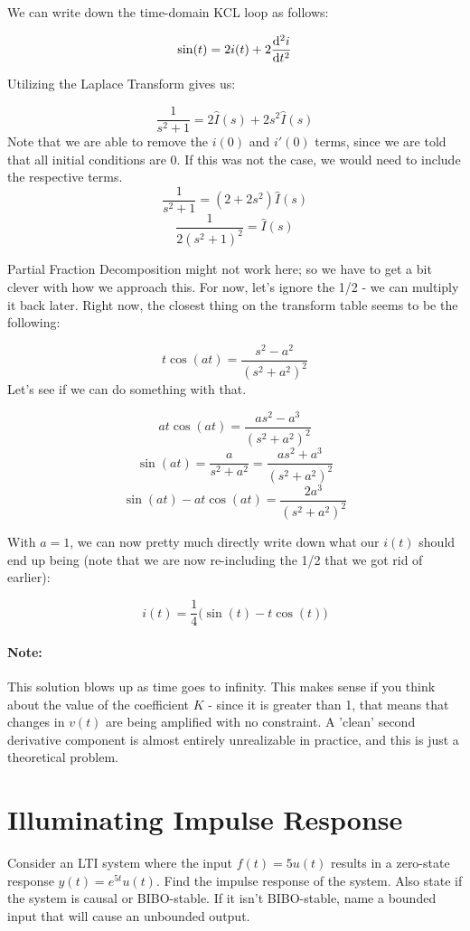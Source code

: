 \documentclass{article}
\begin{document}
We can write down the time-domain KCL loop as follows:

\[
\sin(t) = 2i(t) + 2\dv[2]{i}{t}
\]

Utilizing the Laplace Transform gives us:

\[
\frac{1}{s^2+1} = 2\hat{I}(s) + 2s^2\hat{I}(s)
\]
Note that we are able to remove the $i(0)$ and $i'(0)$ terms, since we are told that all initial conditions are 0. If this was not the case, we would need to include the respective terms.
\[
\frac{1}{s^2+1} = (2+2s^2)\hat{I}(s)
\]
\[
\frac{1}{2(s^2+1)^2} = \hat{I}(s)
\]

Partial Fraction Decomposition might not work here; so we have to get a bit clever with how we approach this. For now, let's ignore the 1/2 - we can multiply it back later. Right now, the closest thing on the transform table seems to be the following:

\[
t\cos(at) = \frac{s^2 - a^2}{(s^2 + a^2)^2}
\]
Let's see if we can do something with that.

\[
at\cos(at) = \frac{as^2 - a^3}{(s^2 + a^2)^2}
\]
\[
\sin(at) = \frac{a}{s^2+a^2} = \frac{as^2 + a^3}{(s^2 + a^2)^2}
\]
\[
\sin(at) - at\cos(at) = \frac{2a^3}{(s^2 + a^2)^2}
\]

With $a = 1$, we can now pretty much directly write down what our $i(t)$ should end up being (note that we are now re-including the 1/2 that we got rid of earlier):

\[
\boxed{i(t) = \frac{1}{4}\big(\sin(t) - t\cos(t)\big)}
\]

\paragraph{Note:} This solution blows up as time goes to infinity. This makes sense if you think about the value of the coefficient $K$ - since it is greater than 1, that means that changes in $v(t)$ are being amplified with no constraint. A 'clean' second derivative component is almost entirely unrealizable in practice, and this is just a theoretical problem.

\newpage

\section{Illuminating Impulse Response}

Consider an LTI system where the input $f(t) = 5u(t)$ results in a zero-state response $y(t) = e^{5t}u(t)$. Find the impulse response of the system. Also state if the system is causal or BIBO-stable. If it isn't BIBO-stable, name a bounded input that will cause an unbounded output.
\end{document}
